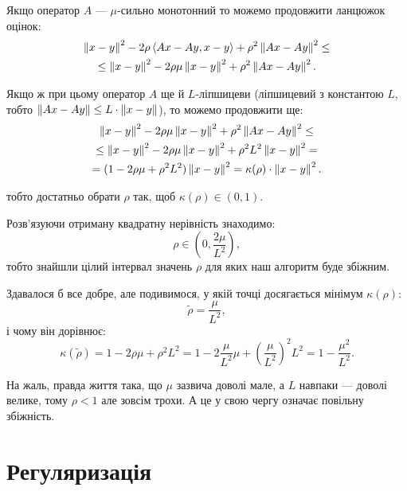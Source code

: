 Якщо оператор $A$ --- $\mu$-сильно монотонний то можемо продовжити ланцюжок оцінок:
\begin{multline}
    \left\| x - y \right\|^2 - 2 \rho \left\langle A x - A y, x - y \right\rangle + \rho^2 \left\| A x - Ay \right\|^2 \le \\
    \le \left\| x - y \right\|^2 - 2 \rho \mu \left\| x - y \right\|^2 + \rho^2 \left\| A x - A y \right\|^2.
\end{multline}

Якщо ж при цьому оператор $A$ ще й $L$-ліпшицеви (ліпшицевий з константою $L$, тобто $\left\| A x - A y \right\| \le L \cdot \left\| x - y \right\|$), то можемо продовжити ще:
\begin{multline}
    \left\| x - y \right\|^2 - 2 \rho \mu \left\| x - y \right\|^2 + \rho^2 \left\| A x - A y \right\|^2 \le \\
    \le \left\| x - y \right\|^2 - 2 \rho \mu \left\| x - y \right\|^2 + \rho^2 L^2 \left\| x - y \right\|^2 = \\
    = (1 - 2 \rho \mu + \rho^2 L^2) \left\| x - y \right\|^2 = \kappa(\rho) \cdot \left\| x - y \right\|^2.
\end{multline}

тобто достатньо обрати $\rho$ так, щоб $\kappa(\rho) \in (0, 1)$. \medskip

Розв'язуючи отриману квадратну нерівність знаходимо:
\begin{equation}
    \rho \in \left(0, \frac{2 \mu}{L^2}\right),
\end{equation}
тобто знайшли цілий інтервал значень $\rho$ для яких наш алгоритм буде збіжним. \medskip

Здавалося б все добре, але подивимося, у якій точці досягається мінімум $\kappa(\rho)$:
\begin{equation}
    \tilde \rho = \frac{\mu}{L^2},
\end{equation}
і чому він дорівнює:
\begin{equation}
    \kappa(\tilde \rho) = 1 - 2 \rho \mu + \rho^2 L^2 = 1 - 2 \frac{\mu}{L^2} \mu + \left( \frac{\mu}{L^2} \right)^2 L^2 = 1 - \frac{\mu^2}{L^2}.
\end{equation}

\begin{remark}
    На жаль, правда життя така, що $\mu$ зазвича доволі мале, а $L$ навпаки --- доволі велике, тому $\rho < 1$ але зовсім трохи. А це у свою чергу означає повільну збіжність.
\end{remark}

\section{Регуляризація}

